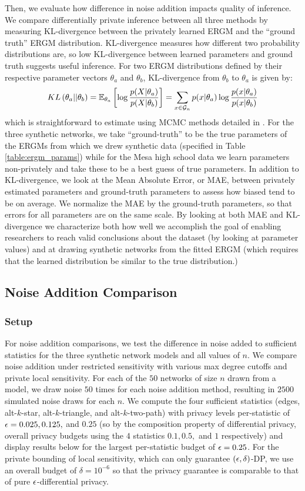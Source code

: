 Then, we evaluate how difference in noise addition impacts quality of inference. We compare differentially private inference between all three methods by measuring KL-divergence between the privately learned ERGM and the ``ground truth'' ERGM distribution. KL-divergence measures how different two probability distributions are, so low KL-divergence between learned parameters and ground truth suggests useful inference. For two ERGM distributions defined by their respective parameter vectors $\theta_a$ and $\theta_b$, KL-divergence from $\theta_b$ to $\theta_a$ is given by:
$$KL\left({\theta}_a || {\theta}_b\right) = \mathbb{E}_{{\theta}_a} \left[\log \frac{p(X | \theta_a)} {p(X | \theta_b) } \right] = \sum_{x \in \mathcal{G}_n} p(x | \theta_a) \log \frac{p(x | \theta_a)} {p(x | \theta_b)}$$
which is straightforward to estimate using MCMC methods detailed in \cite{HG10}. For the three synthetic networks, we take ``ground-truth'' to be the true parameters of the ERGMs from which we drew synthetic data (specified in Table \ref{table:ergm_params}) while for the Mesa high school data we learn parameters non-privately and take these to be a best guess of true parameters. In addition to KL-divergence, we look at the Mean Absolute Error, or MAE, between privately estimated parameters and ground-truth parameters to assess how biased tend to be on average. We normalize the MAE by the ground-truth parameters, so that errors for all parameters are on the same scale. By looking at both MAE and KL-divergence we characterize both how well we accomplish the goal of enabling researchers to reach valid conclusions about the dataset (by looking at parameter values) and at drawing synthetic networks from the fitted ERGM (which requires that the learned distribution be similar to the true distribution.)
 
 \subsection{Noise Addition Comparison}
 
 \subsubsection{Setup}
 For noise addition comparisons, we test the difference in noise added to sufficient statistics for the three synthetic network models and all values of $n$. We compare noise addition under restricted sensitivity with various max degree cutoffs and private local sensitivity. For each of the $50$ networks of size $n$ drawn from a model, we draw noise $50$ times for each noise addition method, resulting in $2500$ simulated noise draws for each $n$. We compute the four sufficient statistics (edges, alt-$k$-star, alt-$k$-triangle, and alt-$k$-two-path) with privacy levels per-statistic of $\epsilon = 0.025, 0.125,$ and $0.25$ (so by the composition property of differential privacy, overall privacy budgets using the $4$ statistics $0.1, 0.5,$ and $1$ respectively) and display results below for the largest per-statistic budget of $\epsilon = 0.25$. For the private bounding of local sensitivity, which can only guarantee $(\epsilon, \delta)$-DP, we use an overall budget of $\delta = 10^{-6}$ so that the privacy guarantee is comparable to that of pure $\epsilon$-differential privacy. 
 
